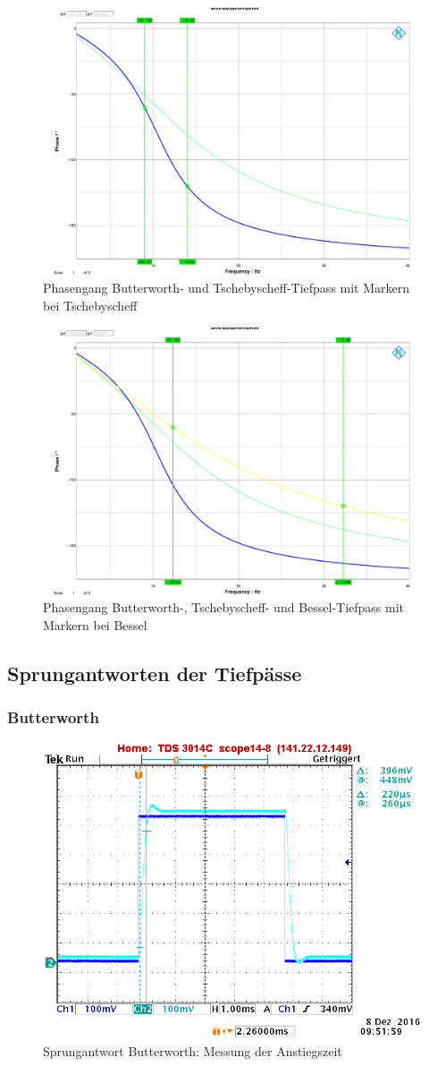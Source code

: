 \begin{figure}[h]
\centering
\includegraphics[width=0.60\linewidth]{Bilder/ImLabor/Phasengang_4_2_Tscheby_TP}
\caption{Phasengang Butterworth- und Tschebyscheff-Tiefpass mit Markern bei Tschebyscheff}
\label{fig:Phasengang_4_2_Tscheby_TP}
\end{figure}

\begin{figure}[h]
\centering
\includegraphics[width=0.60\linewidth]{Bilder/ImLabor/Phasengang_4_3_Bessel_TP_Alle}
\caption{Phasengang Butterworth-, Tschebyscheff- und Bessel-Tiefpass mit Markern bei Bessel}
\label{fig:Phasengang_4_3_Bessel_TP_Alle}
\end{figure}

\newpage

\subsection{Sprungantworten der Tiefpässe}
\subsubsection{Butterworth}

\begin{figure}[h]
	\centering
	\includegraphics[width=0.60\linewidth]{Bilder/ImLabor/Sprungantwort_5_8_Butter_Anstiegszeit}
	\caption{Sprungantwort Butterworth: Messung der Anstiegszeit}
	\label{fig:Sprungantwort_5_8_Butter_Anstiegszeit_Anhang}
\end{figure}

